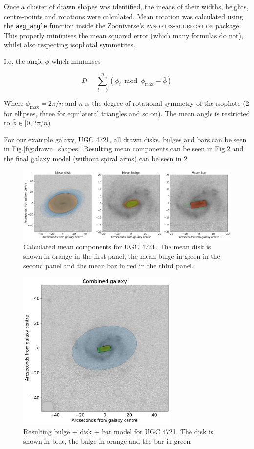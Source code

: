\documentclass[../main.tex]{subfiles}
\begin{document}
Once a cluster of drawn shapes was identified, the means of their widths, heights, centre-points and rotations were calculated. Mean rotation was calculated using the \texttt{avg\_angle} function inside the Zooniverse's \textsc{panoptes-aggregation} package. This properly minimises the mean squared error (which many formulas do not), whilst also respecting isophotal symmetries.

I.e. the angle $\bar{\phi}$ which minimises

\begin{equation}
    D = \sum_{i=0}^n \left(\phi_i \bmod \phi_\text{max} - \bar{\phi}\right)
\end{equation}

Where $\phi_\text{max} = 2\pi / n$ and $n$ is the degree of rotational symmetry of the isophote (2 for ellipses, three for equilateral triangles and so on). The mean angle is restricted to $\bar{\phi} \in [0, 2\pi / n)$

For our example galaxy, UGC 4721, all drawn disks, bulges and bars can be seen in Fig.\ref{fig:drawn_shapes}. Resulting mean components can be seen in Fig.\ref{fig:clustered_shapes} and the final galaxy model (without spiral arms) can be seen in \ref{fig:clustered_shapes}

\begin{figure}
  \includegraphics[width=15cm]{images__results/mean_shapes.pdf}
  \caption{Calculated mean components for UGC 4721. The mean disk is shown in orange in the first panel, the mean bulge in green in the second panel and the mean bar in red in the third panel.}
  \label{fig:mean_shapes}
\end{figure}


\begin{figure}
  \includegraphics[width=8cm]{images__results/clustered_shapes.pdf}
  \caption{Resulting bulge + disk + bar model for UGC 4721. The disk is shown in blue, the bulge in orange and the bar in green.}
  \label{fig:clustered_shapes}
\end{figure}
\end{document}
